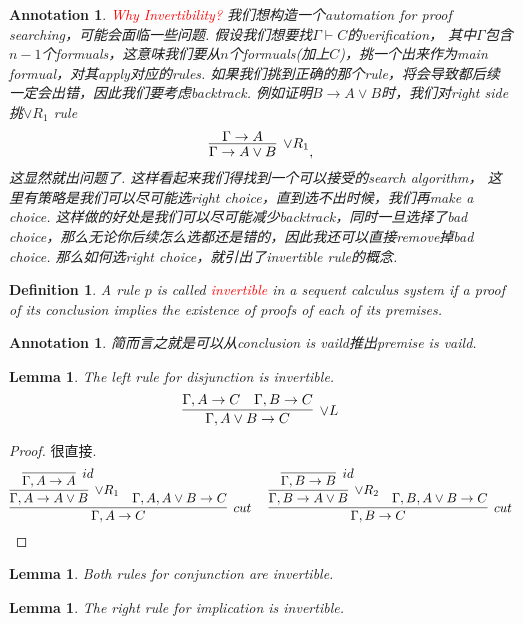 \documentclass{article}
\theoremstyle{plain}
\newtheorem{lemma}[theorem]{Lemma}
\newtheorem{definition}[theorem]{Definition}
\newtheorem{annotation}[theorem]{Annotation}
\theoremstyle{nonumberplain}
\newtheorem{proof}{Proof}
\newcommand{\redt}[1]{\textcolor{red}{#1}}
\begin{document}
\begin{annotation}
 \rm \redt{Why Invertibility?} \cite{15-317-inv} 我们想构造一个automation for proof searching，可能会面临一些问题. 假设我们想要找$\Gamma \vdash C$的verification， 其中$\Gamma$包含$n-1$个formuals，这意味我们要从$n$个formuals(加上$C$)，挑一个出来作为main formual，对其apply对应的rules. 如果我们挑到正确的那个rule，将会导致都后续一定会出错，因此我们要考虑backtrack. 例如证明$B \to A \vee B$时，我们对right side挑$\vee R_1$ rule
$$
\infer[\vee R_1]{\Gamma \to A \vee B}{\Gamma \to A},
$$ 
这显然就出问题了. 这样看起来我们得找到一个可以接受的search algorithm， 这里有策略是我们可以尽可能选right choice，直到选不出时候，我们再make a choice. 这样做的好处是我们可以尽可能减少backtrack，同时一旦选择了bad choice，那么无论你后续怎么选都还是错的，因此我还可以直接remove掉bad choice. 那么如何选right choice，就引出了invertible rule的概念. 
\end{annotation}

\begin{definition}
\rm A rule $p$ is called \redt{invertible} in a sequent calculus system if a proof of its conclusion implies the existence of proofs of each of its premises. 
\end{definition}

\begin{annotation}
\rm 简而言之就是可以从conclusion is vaild推出premise is vaild.
\end{annotation}

\begin{lemma}
\rm The left rule for disjunction is invertible.
$$
\infer[\vee L]{\Gamma, A \vee B \to C}{\Gamma, A \to C & \Gamma, B \to C}
$$
\end{lemma}

\begin{proof}
\rm 很直接.
$$
\infer[cut]{\Gamma, A \to C}{\infer[\vee R_1]{\Gamma, A \to A \vee B}{\infer[id]{\Gamma,A \to A}{}} & \Gamma, A, A \vee B  \to C} ~~~~ \infer[cut]{\Gamma, B \to C}{\infer[\vee R_2]{\Gamma, B \to A \vee B}{\infer[id]{\Gamma,B \to B}{}} & \Gamma, B,A \vee B \to C}
$$
\end{proof}

\begin{lemma}
\rm Both rules for conjunction are invertible.
\end{lemma}

\begin{lemma}
\rm The right rule for implication is invertible.
\end{lemma}
\end{document}
